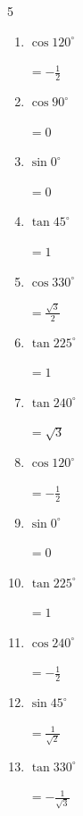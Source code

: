 \begin{multicols}{5}
\begin{enumerate}
  \item $\displaystyle \cos{120^\circ}$

        $\displaystyle =-\frac{1}{2}$

  \item $\displaystyle \cos{90^\circ}$

        $\displaystyle =0$

  \item $\displaystyle \sin{0^\circ}$

        $\displaystyle =0$

  \item $\displaystyle \tan{45^\circ}$

        $\displaystyle =1$

  \item $\displaystyle \cos{330^\circ}$

        $\displaystyle =\frac{\sqrt{3}}{2}$

  \item $\displaystyle \tan{225^\circ}$

        $\displaystyle =1$

  \item $\displaystyle \tan{240^\circ}$

        $\displaystyle =\sqrt{3}$

  \item $\displaystyle \cos{120^\circ}$

        $\displaystyle =-\frac{1}{2}$

  \item $\displaystyle \sin{0^\circ}$

        $\displaystyle =0$

  \item $\displaystyle \tan{225^\circ}$

        $\displaystyle =1$

\columnbreak %

  \item $\displaystyle \cos{240^\circ}$

        $\displaystyle =-\frac{1}{2}$

  \item $\displaystyle \sin{45^\circ}$

        $\displaystyle =\frac{1}{\sqrt{2}}$

  \item $\displaystyle \tan{330^\circ}$

        $\displaystyle =-\frac{1}{\sqrt{3}}$


\end{enumerate}
\end{multicols}
